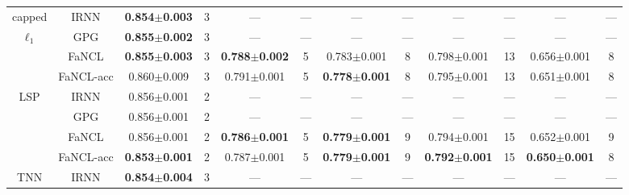 \documentclass[10pt,journal,compsoc]{IEEEtran}
\begin{document}
\begin{table*}[ht]
\begin{tabular}{cc|cc|cc|cc|cc|cc}
	 capped  &    \textsf{IRNN}    & \textbf{0.854$\pm$0.003} &         3         &           ---            &       ---       &           ---            &       ---        &           ---            &    ---    &           ---            &   ---   \\ \cline{2-12}
	$\ell_1$ &    \textsf{GPG}     & \textbf{0.855$\pm$0.002} &         3         &           ---            &       ---       &           ---            &       ---        &           ---            &    ---    &           ---            &   ---   \\ \cline{2-12}
	         &   \textsf{FaNCL}    & \textbf{0.855$\pm$0.003} &         3         & \textbf{0.788$\pm$0.002} &        5        &     0.783$\pm$0.001      &        8         &     0.798$\pm$0.001      &    13     &     0.656$\pm$0.001      &    8    \\ \cline{2-12}
	         & \textsf{FaNCL-acc}  &     0.860$\pm$0.009      &         3         &     0.791$\pm$0.001      &        5        & \textbf{0.778$\pm$0.001} &        8         &     0.795$\pm$0.001      &    13     &     0.651$\pm$0.001      &    8    \\ \hline
	  LSP    &    \textsf{IRNN}    &     0.856$\pm$0.001      &         2         &           ---            &       ---       &           ---            &       ---        &           ---            &    ---    &           ---            &   ---   \\ \cline{2-12}
	         &    \textsf{GPG}     &     0.856$\pm$0.001      &         2         &           ---            &       ---       &           ---            &       ---        &           ---            &    ---    &           ---            &   ---   \\ \cline{2-12}
	         &   \textsf{FaNCL}    &     0.856$\pm$0.001      &         2         & \textbf{0.786$\pm$0.001} &        5        & \textbf{0.779$\pm$0.001} &        9         &     0.794$\pm$0.001      &    15     &     0.652$\pm$0.001      &    9    \\ \cline{2-12}
	         & \textsf{FaNCL-acc}  & \textbf{0.853$\pm$0.001} &         2         &     0.787$\pm$0.001      &        5        & \textbf{0.779$\pm$0.001} &        9         & \textbf{0.792$\pm$0.001} &    15     & \textbf{0.650$\pm$0.001} &    8    \\ \hline
	  TNN    &    \textsf{IRNN}    & \textbf{0.854$\pm$0.004} &         3         &           ---            &       ---       &           ---            &       ---        &           ---            &    ---    &           ---            &   ---   \\ \cline{2-12}

\end{tabular}
\end{table*}
\end{document}
